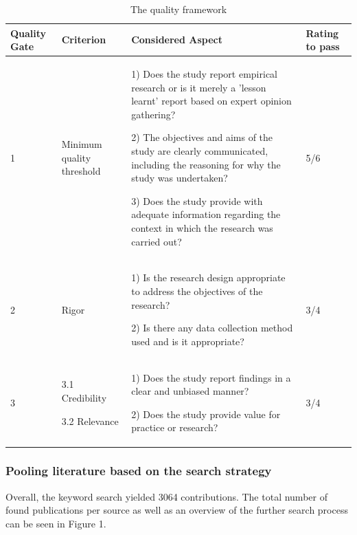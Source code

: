 \documentclass{bmcart}
\begin{document}
\begin{table}[h]
  \renewcommand{\arraystretch}{1.5}
  \caption[]{The quality framework}
  \begin{tabular}{|p{0.7cm}|p{2cm}|p{6cm}|p{1.5cm}|}
      \hline
      Quality Gate & Criterion & Considered Aspect & Rating to pass \\ 

      \hline

      1 & Minimum quality threshold & 
      
      1) Does the study report empirical research or is it merely a 'lesson learnt' report based on expert opinion gathering?

      2) The objectives and aims of the study are clearly communicated, including the reasoning for why the study was undertaken?

      3) Does the study provide with adequate information regarding the context in which the research was carried out?
      & 5/6 \\ 
      \hline
      2 & Rigor & 
      
      1) Is the research design appropriate to address the objectives of the research?

      2) Is there any data collection method used and is it appropriate?
      & 3/4 \\ 
      \hline  
      3 &
      3.1 Credibility 

      3.2 Relevance 
      & 
      1) Does the study report findings in a clear and unbiased manner?

      2) Does the study provide value for practice or research?
      & 
      3/4 \\ 
      \hline   
  \end{tabular}
  \label{qualityFramework}
\end{table}


\subsubsection{Pooling literature based on the search strategy}
Overall, the keyword search yielded 3064 contributions. The total number of found publications per source as well as an overview of the further search process can be seen in Figure 1.
\end{document}
